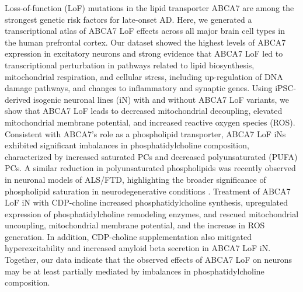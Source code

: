 Loss-of-function (LoF) mutations in the lipid transporter ABCA7 are among the strongest genetic risk factors for late-onset AD. Here, we generated a transcriptional atlas of ABCA7 LoF effects across all major brain cell types in the human prefrontal cortex. Our dataset showed the highest levels of ABCA7 expression in excitatory neurons and strong evidence that ABCA7 LoF led to transcriptional perturbation in pathways related to lipid biosynthesis, mitochondrial respiration, and cellular stress, including up-regulation of DNA damage pathways, and changes to inflammatory and synaptic genes. Using iPSC-derived isogenic neuronal lines (iN) with and without ABCA7 LoF variants, we show that ABCA7 LoF leads to decreased mitochondrial decoupling, elevated mitochondrial membrane potential, and increased reactive oxygen species (ROS). Consistent with ABCA7’s role as a phospholipid transporter, ABCA7 LoF iNs exhibited significant imbalances in phosphatidylcholine composition, characterized by increased saturated PCs and decreased polyunsaturated (PUFA) PCs. A similar reduction in polyunsaturated phospholipids was recently observed in neuronal models of ALS/FTD, highlighting the broader significance of phospholipid saturation in neurodegenerative conditions \cite{Giblin2025-ri}. Treatment of ABCA7 LoF iN with CDP-choline increased phosphatidylcholine synthesis, upregulated expression of phosphatidylcholine remodeling enzymes, and rescued mitochondrial uncoupling, mitochondrial membrane potential, and the increase in ROS generation. In addition, CDP-choline supplementation also mitigated hyperexcitability and increased amyloid beta secretion in ABCA7 LoF iN. Together, our data indicate that the observed effects of ABCA7 LoF on neurons may be at least partially mediated by imbalances in phosphatidylcholine composition. 

